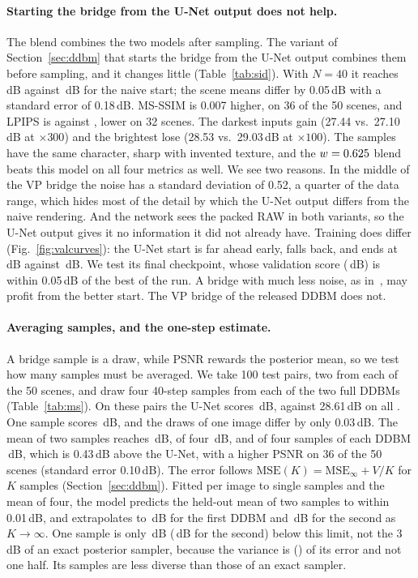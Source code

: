 \paragraph{Starting the bridge from the U-Net output does not help.} The blend combines the two models after sampling. The variant of Section~\ref{sec:ddbm} that starts the bridge from the U-Net output combines them before sampling, and it changes little (Table~\ref{tab:sid}). With $N=40$ it reaches \VPUNETPSNR\,dB against \VPFORTYPSNR\,dB for the naive start; the scene means differ by 0.05\,dB with a standard error of 0.18\,dB. MS-SSIM is 0.007 higher, on 36 of the 50 scenes, and LPIPS is \VPUNETLPIPS{} against \VPFORTYLPIPS{}, lower on 32 scenes. The darkest inputs gain (27.44 vs.\ 27.10\,dB at $\times300$) and the brightest lose (28.53 vs.\ 29.03\,dB at $\times100$). The samples have the same character, sharp with invented texture, and the $w=0.625$ blend beats this model on all four metrics as well. We see two reasons. In the middle of the VP bridge the noise has a standard deviation of 0.52, a quarter of the data range, which hides most of the detail by which the U-Net output differs from the naive rendering. And the network sees the packed RAW in both variants, so the U-Net output gives it no information it did not already have. Training does differ (Fig.~\ref{fig:valcurves}): the U-Net start is far ahead early, falls back, and ends at \VPUVAL\,dB against \VPVAL\,dB. We test its final checkpoint, whose validation score (\VPUVALLAST\,dB) is within 0.05\,dB of the best of the run. A bridge with much less noise, as in~\cite{ohayon2025pmrf}, may profit from the better start. The VP bridge of the released DDBM does not.

\paragraph{Averaging samples, and the one-step estimate.} A bridge sample is a draw, while PSNR rewards the posterior mean, so we test how many samples must be averaged. We take 100 test pairs, two from each of the 50 scenes, and draw four 40-step samples from each of the two full DDBMs (Table~\ref{tab:ms}). On these pairs the U-Net scores \MSUNETPSNR\,dB, against 28.61\,dB on all \SIDTESTPAIRS{}. One sample scores \MSSINGLEPSNR\,dB, and the draws of one image differ by only 0.03\,dB. The mean of two samples reaches \MSTWOPSNR\,dB, of four \MSFOURPSNR\,dB, and of four samples of each DDBM \MSEIGHTPSNR\,dB, which is 0.43\,dB above the U-Net, with a higher PSNR on 36 of the 50 scenes (standard error 0.10\,dB). The error follows $\mathrm{MSE}(K)=\mathrm{MSE}_\infty+V/K$ for $K$ samples (Section~\ref{sec:ddbm}). Fitted per image to single samples and the mean of four, the model predicts the held-out mean of two samples to within 0.01\,dB, and extrapolates to \MSINFNAIVE\,dB for the first DDBM and \MSINFUSTART\,dB for the second as $K\to\infty$. One sample is only \MSGAPNAIVE\,dB (\MSGAPUSTART\,dB for the second) below this limit, not the 3\,dB of an exact posterior sampler, because the variance is \MSSHARENAIVE{} (\MSSHAREUSTART) of its error and not one half. Its samples are less diverse than those of an exact sampler.

